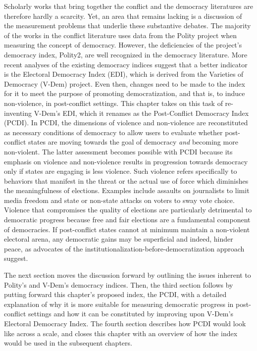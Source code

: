 \documentclass [11pt]{article}
\begin{document}
Scholarly works that bring together the conflict and the democracy literatures are therefore hardly a scarcity. Yet, an area that remains lacking is a discussion of the measurement problems that underlie these substantive debates. The majority of the works in the conflict literature uses data from the Polity project when measuring the concept of democracy. However, the deficiencies of the project's democracy index, Polity2, are well recognized in the democracy literature. More recent analyses of the existing democracy indices suggest that a better indicator is the Electoral Democracy Index (EDI), which is derived from the Varieties of Democracy (V-Dem) project. Even then, changes need to be made to the index for it to meet the purpose of promoting democratization, and that is, to induce non-violence, in post-conflict settings. This chapter takes on this task of re-inventing V-Dem's EDI, which it renames as the Post-Conflict Democracy Index (PCDI). In PCDI, the dimensions of violence and non-violence are reconstituted as necessary conditions of democracy to allow users to evaluate whether post-conflict states are moving towards the goal of democracy \emph{and} becoming more non-violent. The latter assessment becomes possible with PCDI because its emphasis on violence and non-violence results in progression towards democracy only if states are engaging is less violence. Such violence refers specifically to behaviors that manifest in the threat or the actual use of force which diminishes the meaningfulness of elections. Examples include assaults on journalists to limit media freedom and state or non-state attacks on voters to sway vote choice. Violence that compromises the quality of elections are particularly detrimental to democratic progress because free and fair elections are a fundamental component of democracies. If post-conflict states cannot at minimum maintain a non-violent electoral arena, any democratic gains may be superficial and indeed, hinder peace, as advocates of the institutionalization-before-democratization approach suggest.

The next section moves the discussion forward by outlining the issues inherent to Polity's and V-Dem's democracy indices. Then, the third section follows by putting forward this chapter's proposed index, the PCDI, with a detailed explanation of why it is more suitable for measuring democratic progress in post-conflict settings and how it can be constituted by improving upon V-Dem's Electoral Democracy Index. The fourth section describes how PCDI would look like across a scale, and closes this chapter with an overview of how the index would be used in the subsequent chapters.
\end{document}
